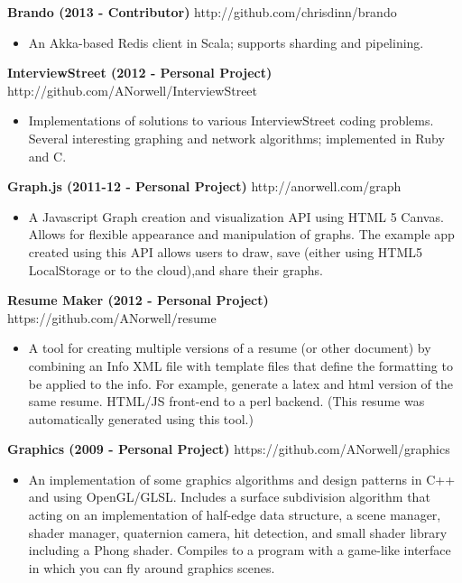 \documentclass[line,margin]{res}
\begin{document}
\begin{resume}
{\bf Brando (2013 - Contributor)} \hfill http://github.com/chrisdinn/brando
                 \begin{itemize}  \itemsep -2pt %
                 \item An Akka-based Redis client in Scala; supports sharding and pipelining.
                \end{itemize}
  
{\bf InterviewStreet (2012 - Personal Project)} \hfill http://github.com/ANorwell/InterviewStreet
                 \begin{itemize}  \itemsep -2pt %
                 \item Implementations of solutions to various InterviewStreet coding problems. Several interesting graphing and network algorithms; implemented in Ruby and C. 
                \end{itemize}
  
{\bf Graph.js (2011-12 - Personal Project)} \hfill http://anorwell.com/graph
                 \begin{itemize}  \itemsep -2pt %
                 \item A Javascript Graph creation and visualization API using HTML 5 Canvas. Allows for flexible appearance and manipulation of graphs.  The example app created using this API allows users to draw, save (either using HTML5 LocalStorage or to the cloud),and share their graphs. 
                \end{itemize}
  
{\bf Resume Maker (2012 - Personal Project)} \hfill https://github.com/ANorwell/resume
                 \begin{itemize}  \itemsep -2pt %
                 \item A tool for creating multiple versions of a resume (or other document) by combining an Info XML file with template files that define the formatting to be applied to the info. For example, generate a latex and html version of the same resume. HTML/JS front-end to a perl backend. (This resume was automatically generated using this tool.)
                \end{itemize}
  
{\bf Graphics (2009 - Personal Project)} \hfill https://github.com/ANorwell/graphics
                 \begin{itemize}  \itemsep -2pt %
                 \item An implementation of some graphics algorithms and design patterns in C++ and using OpenGL/GLSL. Includes a surface subdivision algorithm that acting on an implementation of half-edge data structure, a scene manager, shader manager, quaternion camera, hit detection, and small shader library including a Phong shader. Compiles to a program with a game-like interface in which you can fly around graphics scenes.
                \end{itemize}
  



\end{resume}
\end{document}
